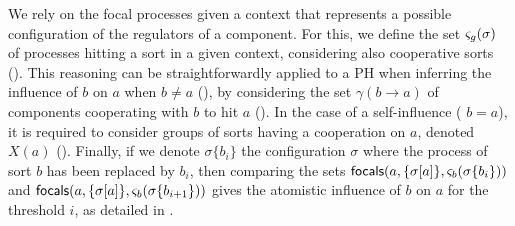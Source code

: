 We rely on the focal processes given a context that represents a possible configuration of the regulators of a component.
For this, we define the set $\varsigma_g(\sigma)$ of processes hitting a sort in a given context, considering also cooperative sorts ().
This reasoning can be straightforwardly applied to a PH when inferring the influence of $b$ on $a$
when $b\neq a$ (), by considering the set $\gamma(b\rightarrow a)$ of components cooperating with $b$ to hit $a$ (). In the case of a self-influence (\ie{} $b = a$), it is required to consider groups of sorts having a cooperation on $a$, denoted $X(a)$ (). Finally, if we denote $\sigma\{b_i\}$ the configuration $\sigma$ where the process of sort $b$ has been replaced
by $b_i$, then comparing the sets $\mathsf{focals}(a, \{\sigma[a]\}, \varsigma_b(\sigma\{b_i\}))$ and $\mathsf{focals}(a, \{\sigma[a]\}, \varsigma_b(\sigma\{b_{i+1}\}))$ gives the atomistic influence of $b$ on $a$ for the threshold $i$, as detailed in .

\begin{comment}
Given a configuration $\sigma\in\prod_{c\in\gamma(b\rightarrow a)} L_c$, 
$\focals(a,\{a_i\},\ctx_b(\sigma))$ gives the bounces that a given process $a_i$ can make in the
context $\ctx_b(\sigma)$.
We note $\sigma\{b_i\}$ the configuration $\sigma$ where the process of sort $b$ has been replaced
by $b_i$.
If there exists $b_i,b_{i+1}\in L_b$ such that one bounce in 
$\focals(a, \{\sigma[a]\}, \ctx_b(\sigma\{b_i\}))$
has a lower (resp. higher) level that one bounce in
$\focals(a, \{\sigma[a]\}, \ctx_b(\sigma\{b_{i+1}\}))$, then
$b$ as positive (resp. negative) influence on $a$ with a maximum threshold $l=i+1$.

Then, we infer that $a$ has a self-influence if its current level can have an impact on its own
evolution at a given configuration $\sigma$.
We consider here a configuration $\sigma$ of a group $g$ of sorts having a cooperation on $a$.
This set of sort groups is given by $X(a)$ (\pref{eq:influence-groups}) which returns the set of
connected components (noted $\mathcal C$) of the graph linking two regulators $b,c$ of $a$ if there
is a cooperative sort hitting $a$ regulated by both of them.
Given $a_i,a_{i+1}\in L_a$, we pick $a_j\in\focals(a,\{a_i\},\ctx_g(\sigma\{a_i\}))$ and
$a_k\in\focals(a,\{a_{i+1}\},\ctx_g(\sigma\{a_{i+1}\}))$.
If $k=j+1$, we can not conclude as there is no difference in the evolution of both levels.
If $k\neq j+1$ and $k-j\neq 0$, then $a_i$ and $a_{i+1}$ have divergent evolutions: we infer an
influence of sign of $k-j$ at threshold $i+1$.
We note that some aspects of this inference are arbitrary and may impact the number of parameters to
infer in the next section.
In particular, in some cases, the use of intervals for Thomas' parameters drops the requirement of
inferring a self-activation.
\end{comment}

